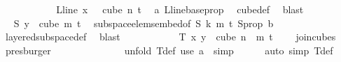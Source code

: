 \begin{isabellebody}
\ \ \ \ \ \ \ \ \isamarkupfalse%
\ \isamarkupfalse%
\ {\isachardoublequoteopen}L{\isacharunderscore}{\kern0pt}line\ {\isacharparenleft}{\kern0pt}x\ {}{\isacharparenright}{\kern0pt}\ {\isasymin}\ cube\ n\ {\isacharparenleft}{\kern0pt}t{\isacharplus}{\kern0pt}{}{\isacharparenright}{\kern0pt}{\isachardoublequoteclose}\ \isamarkupfalse%
\ a\ L{\isacharunderscore}{\kern0pt}line{\isacharunderscore}{\kern0pt}base{\isacharunderscore}{\kern0pt}prop\ \isamarkupfalse%
\ cube{\isacharunderscore}{\kern0pt}def\ \isamarkupfalse%
\ blast\isanewline
\ \ \ \ \ \ \ \ \isamarkupfalse%
\ \isamarkupfalse%
\ {\isachardoublequoteopen}S\ y\ {\isasymin}\ cube\ m\ {\isacharparenleft}{\kern0pt}t{\isacharplus}{\kern0pt}{}{\isacharparenright}{\kern0pt}{\isachardoublequoteclose}\ \isamarkupfalse%
\ subspace{\isacharunderscore}{\kern0pt}elems{\isacharunderscore}{\kern0pt}embed{\isacharbrackleft}{\kern0pt}of\ {\isachardoublequoteopen}S{\isachardoublequoteclose}\ {\isachardoublequoteopen}k{\isachardoublequoteclose}\ {\isachardoublequoteopen}m{\isachardoublequoteclose}\ {\isachardoublequoteopen}t{\isacharplus}{\kern0pt}{}{\isachardoublequoteclose}{\isacharbrackright}{\kern0pt}\ S{\isacharunderscore}{\kern0pt}prop\ b\ \ \isamarkupfalse%
\ layered{\isacharunderscore}{\kern0pt}subspace{\isacharunderscore}{\kern0pt}def\ \isamarkupfalse%
\ blast\isanewline
\ \ \ \ \ \ \ \ \isamarkupfalse%
\ \isamarkupfalse%
\ {\isachardoublequoteopen}T{\isacharprime}{\kern0pt}\ x\ y\ {\isasymin}\ cube\ {\isacharparenleft}{\kern0pt}n\ {\isacharplus}{\kern0pt}\ m{\isacharparenright}{\kern0pt}\ {\isacharparenleft}{\kern0pt}t\ {\isacharplus}{\kern0pt}\ {}{\isacharparenright}{\kern0pt}{\isachardoublequoteclose}\ \isamarkupfalse%
\ join{\isacharunderscore}{\kern0pt}cubes\ \isamarkupfalse%
\ presburger\isanewline
\ \ \ \ \ \ \isamarkupfalse%
\isanewline
\ \ \ \ \ \ \isamarkupfalse%
\ {\isacharparenleft}{\kern0pt}unfold\ T{\isacharprime}{\kern0pt}{\isacharunderscore}{\kern0pt}def{\isacharsemicolon}{\kern0pt}\ use\ a\ \ simp{\isacharparenright}{\kern0pt}\isanewline
\ \ \ \ \isamarkupfalse%
\ {\isacharparenleft}{\kern0pt}auto\ simp{\isacharcolon}{\kern0pt}\ T{\isacharprime}{\kern0pt}{\isacharunderscore}{\kern0pt}def{\isacharparenright}{\kern0pt}\isanewline

\end{isabellebody}
